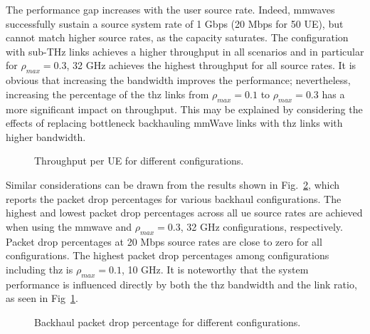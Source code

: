 The performance gap increases with the user source rate. Indeed, 
\glspl{mmwave} successfully sustain a source system rate of 1 Gbps (20 Mbps for 50 UE), 
but cannot match higher source rates, as the capacity saturates.
The configuration with sub-THz links achieves a higher throughput in all scenarios and in particular for $\rho_{max} = 0.3$, 32 GHz achieves the highest throughput for all source rates. It is obvious that increasing the bandwidth improves the performance; nevertheless, increasing the percentage of the \gls{thz} links from $\rho_{max} = 0.1$ to $\rho_{max} = 0.3$ has a more significant impact on throughput. 
This may be explained by considering the effects of replacing bottleneck backhauling mmWave links with \gls{thz} links with higher bandwidth.


\begin{figure}[t!]
    \centering
    \setlength{}
    \setlength{}
    
    \caption{Throughput per UE for different configurations.}
    \label{fig:Throughput}
\end{figure}


Similar considerations can be drawn from the results shown in Fig.~\ref{fig:packetDrop}, which reports the packet drop percentages for various backhaul configurations. %
The highest and lowest packet drop percentages across all \gls{ue} source rates are achieved when using the \gls{mmwave} and $\rho_{max} = 0.3$, 32 GHz configurations, respectively. Packet drop percentages at 20 Mbps source rates are close to zero for all configurations. The highest packet drop percentages among configurations including \gls{thz} is $\rho_{max} = 0.1$, 10 GHz. It is noteworthy that the system performance is influenced directly by both the \gls{thz} bandwidth and the link ratio, as seen in Fig~\ref{fig:Throughput}.

\begin{figure}[t!]
    \centering
    \setlength{}
    \setlength{}
    
    \caption{Backhaul packet drop percentage for different configurations.}
    \label{fig:packetDrop}
\end{figure}

